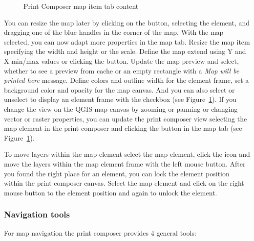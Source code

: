 \begin{figure}[ht]
\centering
\caption{Print Composer map item tab content \nixcaption}\label{fig:print_composer_map_item}
   \goodgap
\end{figure}

You can resize the map later by clicking on the
 button, selecting the
element, and dragging one of the blue handles in the corner of the map. With
the map selected, you can now adapt more properties in the map 
tab. Resize the map item specifying the width and height or the scale. Define
the map extend using Y and X min/max values or clicking the  button. Update the map preview and select, whether to see
a preview from cache or an empty rectangle with a \textit{Map will be
printed here} message. Define colors and outline width for the element
frame, set a background color and opacity for the map canvas. And you can
also select or unselect to display an element frame with the 
checkbox (see Figure~\ref{fig:print_composer_map_item}). If you change the
view on the QGIS map canvas by zooming or panning or changing vector or
raster properties, you can update the print composer view selecting the map
element in the print composer and clicking the  button
in the map  tab (see Figure~\ref{fig:print_composer_map_item}). 

To move layers within the map element select the map element, click 
the  icon 
and move the layers within the map element frame with the left mouse button.
After you found the right place for an element, you can lock the element
position within the print composer canvas. Select the map element and click
on the right mouse button to  the element
position and again to unlock the element.

\subsubsection{Navigation tools}

For map navigation the print composer provides 4 general tools:

